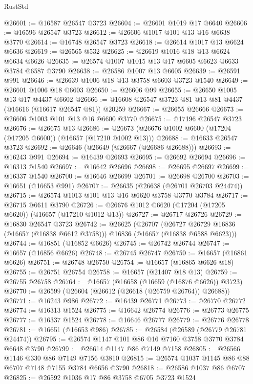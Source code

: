 \begin{lexlean}{RustStd}
\begin{coremodule}
@26601 := @16587 @26547 @3723
@26604 := @26601 @1019 @17 @6640
@26606 := @16596 @26547 @3723
@26612 := @26606 @1017 @101 @13 @16 @6638 @3770
@26614 := @16748 @26547 @3723
@26618 := @26614 @1017 @13 @6624 @6636
@26619 := @26565 @532
@26625 := @26619 @1016 @18 @13 @6624 @6634 @6626
@26635 := @26574 @1007 @1015 @13 @17 @6605 @6623 @6633 @3784 @6587 @3790
@26638 := @26586 @1007 @13 @6605
@26639 := @26591 @991
@26646 := @26639 @1006 @18 @13 @3758 @6603 @3723 @1540
@26649 := @26601 @1006 @18 @6603
@26650 := @26606 @99
@26655 := @26650 @1005 @13 @17 @4437 @6602
@26666 := @16608 @26547 @3723 @81 @13 @81 @4437 (@16616 (@16617 @26547 @81)) @20259
@26667 := @26655 @26666
@26673 := @26606 @1003 @101 @13 @16 @6600 @3770
@26675 := @17196 @26547 @3723
@26676 := @26675 @13
@26686 := @26673 (@26676 @1002 @6600 (@17204 (@17205 @6600)) (@16657 (@17210 @1002 @13)))
@26688 := @16633 @26547 @3723
@26692 := @26646 (@26649 (@26667 (@26686 @26688)))
@26693 := @16243 @991
@26694 := @16439 @26693
@26695 := @26692 @26694
@26696 := @16313 @1540
@26697 := @16642 @26696
@26698 := @26695 @26697
@26699 := @16337 @1540
@26700 := @16646 @26699
@26701 := @26698 @26700
@26703 := @16651 (@16653 @991)
@26707 := @26635 (@26638 (@26701 @26703 @24474))
@26715 := @26574 @1013 @101 @13 @16 @6620 @3758 @3770 @3784
@26717 := @26715 @6611 @3790
@26726 := @26676 @1012 @6620 (@17204 (@17205 @6620)) (@16657 (@17210 @1012 @13))
@26727 := @26717 @26726
@26729 := @16830 @26547 @3723
@26742 := @26625
    (@26707
      (@26727 @26729 @16836 (@16657 (@16838 @6612 @3758)))
      @16836
      (@16657 (@16838 @6588 @6623)))
@26744 := @16851 (@16852 @6626)
@26745 := @26742 @26744
@26747 := @16657 (@16856 @6626)
@26748 := @26745 @26747
@26750 := @16657 (@16861 @6626)
@26751 := @26748 @26750
@26754 := @16657 (@16865 @6626 @18)
@26755 := @26751 @26754
@26758 := @16657 (@21407 @18 @13)
@26759 := @26755 @26758
@26764 := @16657 (@16658 (@16659 (@16876 @6626)) @3723)
@26770 := @26599 (@26604 (@26612 (@26618 (@26759 @26764)) @26688))
@26771 := @16243 @986
@26772 := @16439 @26771
@26773 := @26770 @26772
@26774 := @16313 @1524
@26775 := @16642 @26774
@26776 := @26773 @26775
@26777 := @16337 @1524
@26778 := @16646 @26777
@26779 := @26776 @26778
@26781 := @16651 (@16653 @986)
@26785 := @26584 (@26589 (@26779 @26781 @24474))
@26795 := @26574 @1147 @101 @86 @16 @7160 @3758 @3770 @3784 @6648 @3790
@26799 := @26614 @1147 @86 @7149 @7158
@26805 := @26566 @1146 @330 @86 @7149 @7156 @3810
@26815 := @26574 @1037 @1145 @86 @88 @6707 @7148 @7155 @3784 @6656 @3790
@26818 := @26586 @1037 @86 @6707
@26825 := @26592 @1036 @17 @86 @3758 @6705 @3723 @1524

\end{coremodule}
\end{lexlean}
